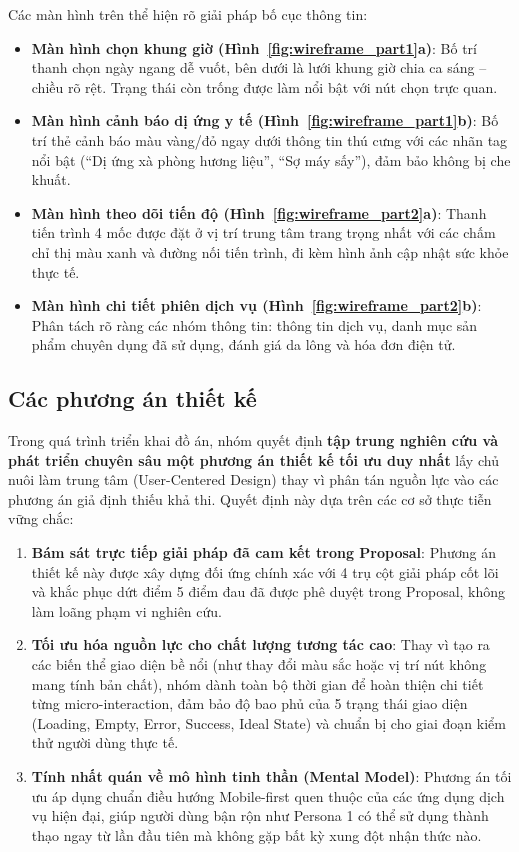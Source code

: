 Các màn hình trên thể hiện rõ giải pháp bố cục thông tin:
\begin{itemize}
    \item \textbf{Màn hình chọn khung giờ (Hình~\ref{fig:wireframe_part1}a)}: Bố trí thanh chọn ngày ngang dễ vuốt, bên dưới là lưới khung giờ chia ca sáng -- chiều rõ rệt. Trạng thái còn trống được làm nổi bật với nút chọn trực quan.
    \item \textbf{Màn hình cảnh báo dị ứng y tế (Hình~\ref{fig:wireframe_part1}b)}: Bố trí thẻ cảnh báo màu vàng/đỏ ngay dưới thông tin thú cưng với các nhãn tag nổi bật (``Dị ứng xà phòng hương liệu'', ``Sợ máy sấy''), đảm bảo không bị che khuất.
    \item \textbf{Màn hình theo dõi tiến độ (Hình~\ref{fig:wireframe_part2}a)}: Thanh tiến trình 4 mốc được đặt ở vị trí trung tâm trang trọng nhất với các chấm chỉ thị màu xanh và đường nối tiến trình, đi kèm hình ảnh cập nhật sức khỏe thực tế.
    \item \textbf{Màn hình chi tiết phiên dịch vụ (Hình~\ref{fig:wireframe_part2}b)}: Phân tách rõ ràng các nhóm thông tin: thông tin dịch vụ, danh mục sản phẩm chuyên dụng đã sử dụng, đánh giá da lông và hóa đơn điện tử.
\end{itemize}

\subsection{Các phương án thiết kế}
Trong quá trình triển khai đồ án, nhóm quyết định \textbf{tập trung nghiên cứu và phát triển chuyên sâu một phương án thiết kế tối ưu duy nhất} lấy chủ nuôi làm trung tâm (User-Centered Design) thay vì phân tán nguồn lực vào các phương án giả định thiếu khả thi. Quyết định này dựa trên các cơ sở thực tiễn vững chắc:
\begin{enumerate}
    \item \textbf{Bám sát trực tiếp giải pháp đã cam kết trong Proposal}: Phương án thiết kế này được xây dựng đối ứng chính xác với 4 trụ cột giải pháp cốt lõi và khắc phục dứt điểm 5 điểm đau đã được phê duyệt trong Proposal, không làm loãng phạm vi nghiên cứu.
    \item \textbf{Tối ưu hóa nguồn lực cho chất lượng tương tác cao}: Thay vì tạo ra các biến thể giao diện bề nổi (như thay đổi màu sắc hoặc vị trí nút không mang tính bản chất), nhóm dành toàn bộ thời gian để hoàn thiện chi tiết từng micro-interaction, đảm bảo độ bao phủ của 5 trạng thái giao diện (Loading, Empty, Error, Success, Ideal State) và chuẩn bị cho giai đoạn kiểm thử người dùng thực tế.
    \item \textbf{Tính nhất quán về mô hình tinh thần (Mental Model)}: Phương án tối ưu áp dụng chuẩn điều hướng Mobile-first quen thuộc của các ứng dụng dịch vụ hiện đại, giúp người dùng bận rộn như Persona 1 có thể sử dụng thành thạo ngay từ lần đầu tiên mà không gặp bất kỳ xung đột nhận thức nào.
\end{enumerate}
